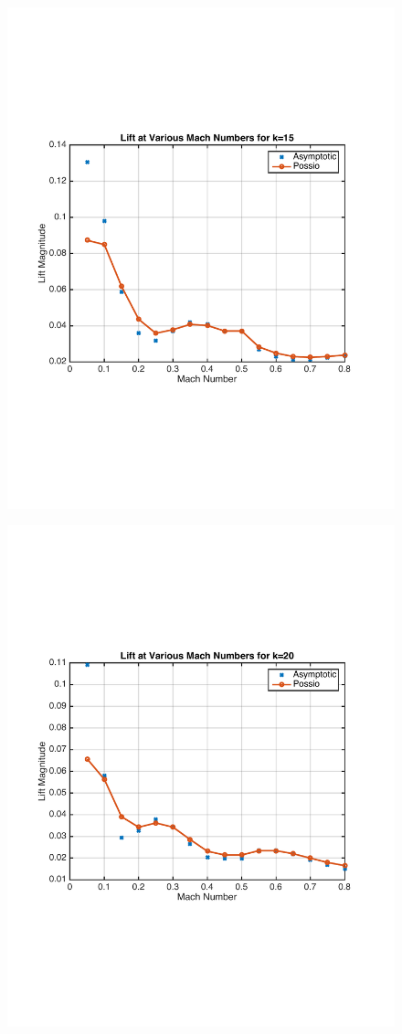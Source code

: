\documentclass{article}
\begin{document}
\begin{figure}[h]
\includegraphics[width = 4 in, height = 3 in]{k15_MachSweep}
\centering
\end{figure}
\begin{figure}[h]
\includegraphics[width = 4 in, height = 3 in]{k20_MachSweep}
\centering
\end{figure}
\end{document}
